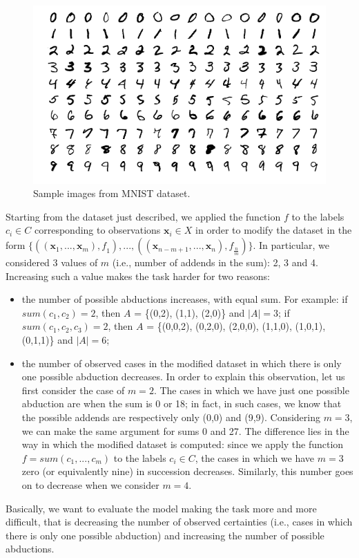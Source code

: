 \begin{figure}[H]
\caption{Sample images from MNIST dataset.}
\label{fig:mnist}
\centering
\includegraphics[scale=0.6]{Figures/mnist.png}
\end{figure}
Starting from the dataset just described, we applied the function $\mathit{f}$ to the labels $\mathit{c}_i \in \mathit{C}$ corresponding to observations $\mathbf{x}_i \in \mathit{X}$ in order to modify the dataset in the form $\{((\mathbf{x}_1,...,\mathbf{x}_m),\mathit{f}_1),...,((\mathbf{x}_{n-m+1},...,\mathbf{x}_n),\mathit{f}_{\frac{n}{m}})\}$. In particular, we considered 3 values of $\mathit{m}$ (i.e., number of addends in the sum): 2, 3 and 4. Increasing such a value makes the task harder for two reasons:

\begin{itemize}
  \item the number of possible abductions increases, with equal sum. For example: if $sum(\mathit{c}_1,\mathit{c}_2) = 2$, then $\mathit{A}$ = \{(0,2), (1,1), (2,0)\} and $|\mathit{A}| = 3$; if $sum(\mathit{c}_1,\mathit{c}_2,\mathit{c}_3) = 2$, then $\mathit{A}$ = \{(0,0,2), (0,2,0), (2,0,0), (1,1,0), (1,0,1), (0,1,1)\} and $|\mathit{A}| = 6$;
  \item the number of observed cases in the modified dataset in which there is only one possible abduction decreases. In order to explain this observation, let us first consider the case of $m = 2$. The cases in which we have just one possible abduction are when the sum is 0 or 18; in fact, in such cases, we know that the possible addends are respectively only (0,0) and (9,9). Considering $m = 3$, we can make the same argument for sums 0 and 27. The difference lies in the way in which the modified dataset is computed: since we apply the function $\mathit{f} = sum(\mathit{c}_1,...,\mathit{c}_m)$ to the labels $\mathit{c}_i \in \mathit{C}$, the cases in which we have $m = 3$ zero (or equivalently nine) in succession decreases. Similarly, this number goes on to decrease when we consider $m = 4$.
\end{itemize}
Basically, we want to evaluate the model making the task more and more difficult, that is decreasing the number of observed certainties (i.e., cases in which there is only one possible abduction) and increasing the number of possible abductions. 
 
